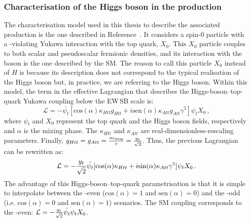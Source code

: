\subsubsection{Characterisation of the Higgs boson in the \tHq production}
\label{sec:Chap1:tH:Characterisation}
The characterisation model used in this thesis to describe the associated \tH production
is the one described in Reference~\cite{Demartin:2015uha}.
It considers a spin-0 particle with a \CP-violating Yukawa interaction with the top quark, $X_0$.
This $X_0$ particle couples to both scalar and pseudoscalar fermionic densities, and its
interaction with the \PW boson is the one described by the SM. The reason to call this particle $X_0$
instead of $H$ is because its description does not correspond to the typical realisation of the Higgs boson
but, in practice, we are referring to the Higgs boson. Within this model, the term in the effective Lagrangian
that describes the Higgs-boson--top-quark Yukawa coupling below the EW$\,$SB scale is:
\begin{equation*}
\label{eq:chap1:Lagrangian:tHq:A}
	\mathcal{L} = -\bar{\psi_{t}}[\text{cos}(\alpha)\kappa_{Htt} g_{Htt} + i \text{sen}(\alpha)\kappa_{Att} g_{Att} \gamma^{5}]\psi_{t}X_{0}\, ,
\end{equation*}
where $\psi_{t}$ and $X_{0}$ represent the top quark and the Higgs boson fields, respectively and $\alpha$ is the \CP mixing phase.
The $\kappa_{Htt}$ and $\kappa_{Att}$ are real-dimensionless-rescaling parameters. 
Finally, $g_{Htt} = g_{Att} = \frac{\mtop}{v} = \frac{\yt}{\sqrt{2}}$. Thus, the previous Lagrangian can
be rewritten as:
\begin{equation}
\label{eq:chap1:Lagrangian:tHq:b}
	\mathcal{L} = -\frac{y_{t}}{\sqrt{2}}\bar{\psi_{t}}[\text{cos}(\alpha)\kappa_{Htt} + i \text{sin}(\alpha)\kappa_{Att} \gamma^{5}]\psi_{t}X_{0}\, .
\end{equation}
The advantage of this Higgs-boson--top-quark parametrisation is that it is simple to interpolate between
the \CP-even ($\text{cos}(\alpha) = 1$ and $\text{sen}(\alpha) = 0$) 
and the \CP-odd (i.e. $\text{cos}(\alpha) = 0$ and $\text{sen}(\alpha) = 1$) scenarios. 
The SM coupling corresponds to the \CP-even: $\mathcal{L} = -\frac{y_{t}}{\sqrt{2}} \bar{\psi_{t}} \psi_{t} X_{0}$.

